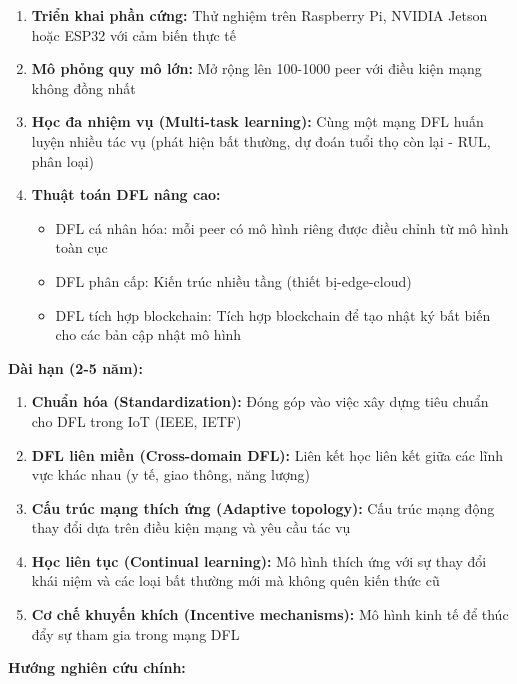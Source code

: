 \begin{enumerate}
    \item \textbf{Triển khai phần cứng:} Thử nghiệm trên Raspberry Pi, NVIDIA Jetson hoặc ESP32 với cảm biến thực tế
    \item \textbf{Mô phỏng quy mô lớn:} Mở rộng lên 100-1000 peer với điều kiện mạng không đồng nhất
    \item \textbf{Học đa nhiệm vụ (Multi-task learning):} Cùng một mạng DFL huấn luyện nhiều tác vụ (phát hiện bất thường, dự đoán tuổi thọ còn lại - RUL, phân loại)
    \item \textbf{Thuật toán DFL nâng cao:}
        \begin{itemize}
            \item DFL cá nhân hóa: mỗi peer có mô hình riêng được điều chỉnh từ mô hình toàn cục
            \item DFL phân cấp: Kiến trúc nhiều tầng (thiết bị-edge-cloud)
            \item DFL tích hợp blockchain: Tích hợp blockchain để tạo nhật ký bất biến cho các bản cập nhật mô hình
        \end{itemize}
\end{enumerate}

\textbf{Dài hạn (2-5 năm):}

\begin{enumerate}
    \item \textbf{Chuẩn hóa (Standardization):} Đóng góp vào việc xây dựng tiêu chuẩn cho DFL trong IoT (IEEE, IETF)
    \item \textbf{DFL liên miền (Cross-domain DFL):} Liên kết học liên kết giữa các lĩnh vực khác nhau (y tế, giao thông, năng lượng)
    \item \textbf{Cấu trúc mạng thích ứng   (Adaptive topology):} Cấu trúc mạng động thay đổi dựa trên điều kiện mạng và yêu cầu tác vụ
    \item \textbf{Học liên tục  (Continual learning):} Mô hình thích ứng với sự thay đổi khái niệm và các loại bất thường mới mà không quên kiến thức cũ
    \item \textbf{Cơ chế khuyến khích (Incentive mechanisms):} Mô hình kinh tế để thúc đẩy sự tham gia trong mạng DFL
\end{enumerate}

\textbf{Hướng nghiên cứu chính:}

